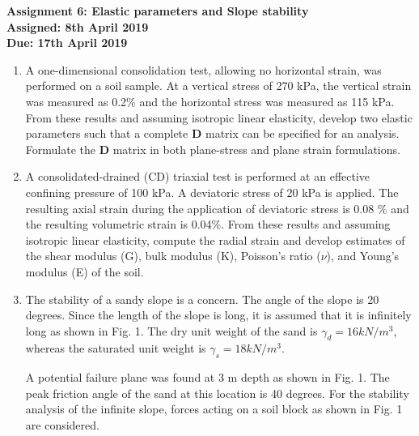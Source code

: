 \documentclass[a4paper,12pt]{article}
\begin{document}
\begin{centering}
	\textbf{
		Assignment 6: Elastic parameters and Slope stability\\
		Assigned: 8th April 2019\\
		Due: 17th April 2019\\
	}
\end{centering}

\vspace{1em}
 
\begin{enumerate}

	\item A one-dimensional consolidation test, allowing no horizontal strain, was performed on a soil sample. At a vertical stress of 270 kPa, the vertical strain was measured as 0.2\% and the horizontal stress was measured as 115 kPa. From these results and assuming isotropic linear elasticity, develop two elastic parameters such that a complete \textbf{D} matrix can be specified for an analysis. Formulate the \textbf{D} matrix in both plane-stress and plane strain formulations.
	
	\item A consolidated-drained (CD) triaxial test is performed at an effective confining pressure of 100 kPa. A deviatoric stress of 20 kPa is applied. The resulting axial strain during the application of deviatoric stress is 0.08 \% and the resulting volumetric strain is 0.04\%. From these results and assuming isotropic linear elasticity, compute the radial strain and develop estimates of the shear modulus (G), bulk modulus (K), Poisson's ratio ($\nu$), and Young's modulus (E) of the soil.
	
	\item The stability of a sandy slope is a concern. The angle of the slope is 20 degrees. Since
	the length of the slope is long, it is assumed that it is infinitely long as shown in Fig. 1.
	The dry unit weight of the sand is $\gamma_d = 16 kN/m^3$, whereas the saturated unit weight is
	$\gamma_s = 18 kN/m^3$.
	
	A potential failure plane was found at 3 m depth as shown in Fig. 1. The peak friction angle of the sand at this location is 40 degrees. For the stability analysis of the infinite slope, forces acting on a soil block as shown in Fig. 1 are considered.
	

\end{enumerate}
\end{document}
